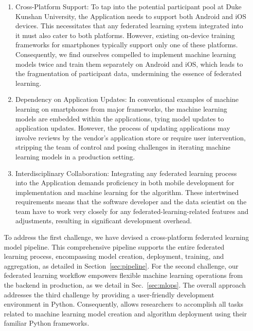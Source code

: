 \begin{enumerate}
\item Cross-Platform Support:
    To tap into the potential participant pool at Duke Kunshan University,
    the \fedcampus Application needs to support both Android and iOS devices.
    This necessitates that any federated learning system integrated into it must
    also cater to both platforms. However,
    existing on-device training frameworks for smartphones typically support
    only one of these platforms. Consequently,
    we find ourselves compelled to implement machine learning models twice and
    train them separately on Android and iOS,
    which leads to the fragmentation of participant data,
    undermining the essence of federated learning.
\item Dependency on Application Updates:
    In conventional examples of machine learning on smartphones from major
    frameworks,
    the machine learning models are embedded within the applications,
    tying model updates to application updates. However,
    the process of updating applications may involve reviews by the vendor's
    application store or require user intervention,
    stripping the \fedcampus team of control and posing challenges in iterating
    machine learning models in a production setting.
\item Interdisciplinary Collaboration:
    Integrating any federated learning process into the \fedcampus Application
    demands proficiency in both mobile development for implementation and
    machine learning for the algorithm.
    These intertwined requirements means that the software developer and
    the data scientist on the \fedcampus team have to work very closely for
    any federated-learning-related features and adjustments,
    resulting in significant development overhead.
\end{enumerate}

To address the first challenge,
we have devised a cross-platform federated learning model pipeline.
This comprehensive pipeline supports the entire federated learning process,
encompassing model creation, deployment, training, and aggregation,
as detailed in Section~\ref{sec:pipeline}. For the second challenge,
our federated learning workflow empowers flexible machine learning operations
from the backend in production, as we detail in Sec.~\ref{sec:mlops}.
The overall approach addresses the third challenge by providing a user-friendly
development environment in Python. Consequently,
\fedkit allows researchers to accomplish all tasks related to machine learning
model creation and algorithm deployment using their familiar Python frameworks.

